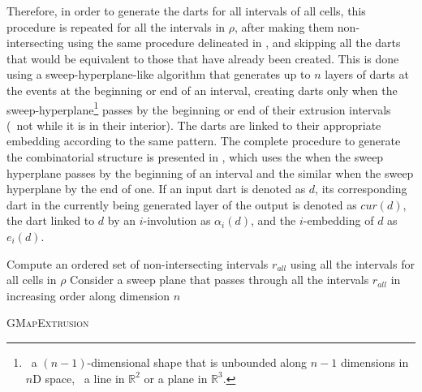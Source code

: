 Therefore, in order to generate the darts for all intervals of all cells, this procedure is repeated for all the intervals in $\rho$, after making them non-intersecting using the same procedure delineated in , and skipping all the darts that would be equivalent to those that have already been created.
This is done using a sweep-hyperplane-like algorithm that generates up to $n$ layers of darts at the events at the beginning or end of an interval, creating darts only when the sweep-hyperplane\footnote{\ie\ a $(n-1)$-dimensional shape that is unbounded along $n-1$ dimensions in $n$D space, \eg\ a line in $\mathbb{R}^2$ or a plane in $\mathbb{R}^3$.} passes by the beginning or end of their extrusion intervals (\ie\ not while it is in their interior).
The darts are linked to their appropriate embedding according to the same pattern.
The complete procedure to generate the combinatorial structure is presented in , which uses the  when the sweep hyperplane passes by the beginning of an interval and the similar  when the sweep hyperplane by the end of one.
If an input dart is denoted as $d$, its corresponding dart in the currently being generated layer of the output is denoted as $cur(d)$, the dart linked to $d$ by an $i$-involution as $\alpha_{i}(d)$, and the $i$-embedding of $d$ as $e_{i}(d)$.

\begin{algorithm}[tb]
\small
{}
\DontPrintSemicolon{}
Compute an ordered set of non-intersecting intervals $r_{all}$ using all the intervals for all cells in $\rho$ \;
Consider a sweep plane that passes through all the intervals $r_{all}$ in increasing order along dimension $n$ \;
\caption{\textsc{GMapExtrusion}}\label{algo:gmapextrusion}
\end{algorithm}

